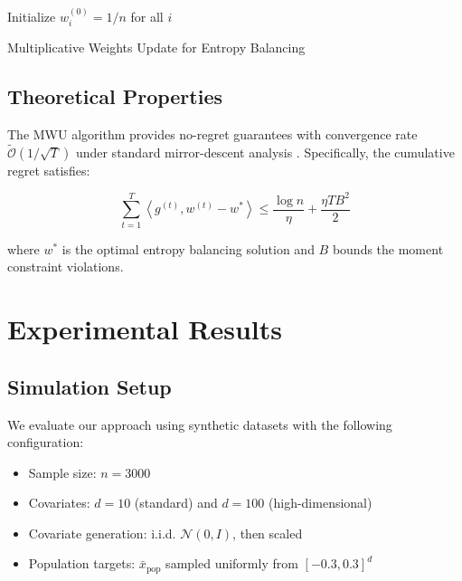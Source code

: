\documentclass[12pt, letterpaper]{article}
\begin{document}
\begin{algorithm}[H]
\SetAlgoLined
{}
Initialize $w^{(0)}_i = 1/n$ for all $i$\;
\caption{Multiplicative Weights Update for Entropy Balancing}
\end{algorithm}

\subsection{Theoretical Properties}

The MWU algorithm provides no-regret guarantees with convergence rate $\tilde{\mathcal{O}}(1/\sqrt{T})$ under standard mirror-descent analysis \citep{Arora12}. Specifically, the cumulative regret satisfies:

\begin{equation}
\sum_{t=1}^T \left\langle g^{(t)}, w^{(t)} - w^* \right\rangle \leq \frac{\log n}{\eta} + \frac{\eta T B^2}{2}
\end{equation}

where $w^*$ is the optimal entropy balancing solution and $B$ bounds the moment constraint violations.

\section{Experimental Results}

\subsection{Simulation Setup}

We evaluate our approach using synthetic datasets with the following configuration:
\begin{itemize}
\item Sample size: $n = 3000$
\item Covariates: $d = 10$ (standard) and $d = 100$ (high-dimensional)
\item Covariate generation: i.i.d. $\mathcal{N}(0, I)$, then scaled
\item Population targets: $\bar{x}_{\text{pop}}$ sampled uniformly from $[-0.3, 0.3]^d$
\end{itemize}
\end{document}
